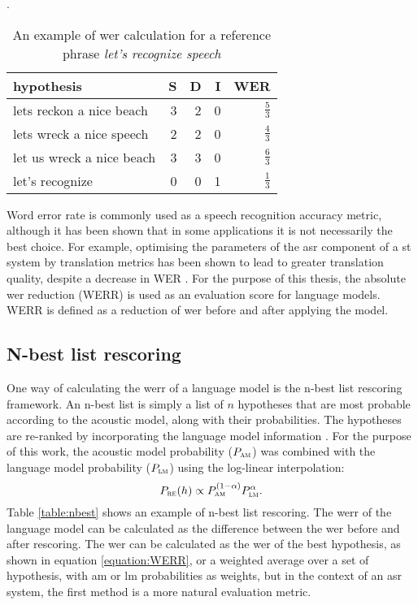 \begin{table}[h!]
	\caption[An example of \gls{wer} calculation]{An example of \gls{wer} calculation for a reference phrase \textit{let's recognize speech}}.
  \label{table:werr}
    \centering
    \begin{tabular*}{.6\linewidth}{@{\extracolsep{\fill}}lrrrr}
	        hypothesis                  & S & D & I & WER\\
		\midrule
		lets reckon a nice beach    & 3 & 2 & 0 & $\frac{5}{3}$\\
		lets wreck a nice speech    & 2 & 2 & 0 & $\frac{4}{3}$\\
		let us wreck a nice beach   & 3 & 3 & 0 & $\frac{6}{3}$\\
		let's recognize             & 0 & 0 & 1 & $\frac{1}{3}$\\
    \end{tabular*}
\end{table}

Word error rate is commonly used as a speech recognition accuracy metric, although it has been shown that in some applications it is not necessarily the best choice. For example, optimising the parameters of the \gls{asr} component of a \gls{st} system by translation metrics has been shown to lead to greater translation quality, despite a decrease in WER \cite{he2011word}. For the purpose of this thesis, the absolute \gls{wer} reduction (WERR) is used as an evaluation score for language models. WERR is defined as a reduction of \gls{wer} before and after applying the model.

	\subsection{N-best list rescoring}
	One way of calculating the \gls{werr} of a language model is the n-best list rescoring framework. An n-best list is simply a list of $n$ hypotheses that are most probable according to the acoustic model, along with their probabilities. The hypotheses are \mbox{re-ranked} by incorporating the language model information \cite{broman2005methods}. For the purpose of this work, the acoustic model probability ($P_{\textsc{am}}$) was combined with the language model probability ($P_{\textsc{lm}}$) using the log-linear interpolation:
	\begin{equation}
		P_{\textsc{re}}(h)\propto P_{\textsc{am}}^{(1-\alpha)}P_{\textsc{lm}}^{\alpha}.
	\end{equation}
	Table \ref{table:nbest} shows an example of n-best list rescoring. The \gls{werr} of the language model can be calculated as the difference between the \gls{wer} before and after rescoring. The \gls{wer} can be calculated as the \gls{wer} of the best hypothesis, as shown in equation \ref{equation:WERR}, or a weighted average over a set of hypothesis, with \gls{am} or \gls{lm} probabilities as weights, but in the context of an \gls{asr} system, the first method is a more natural evaluation metric.


